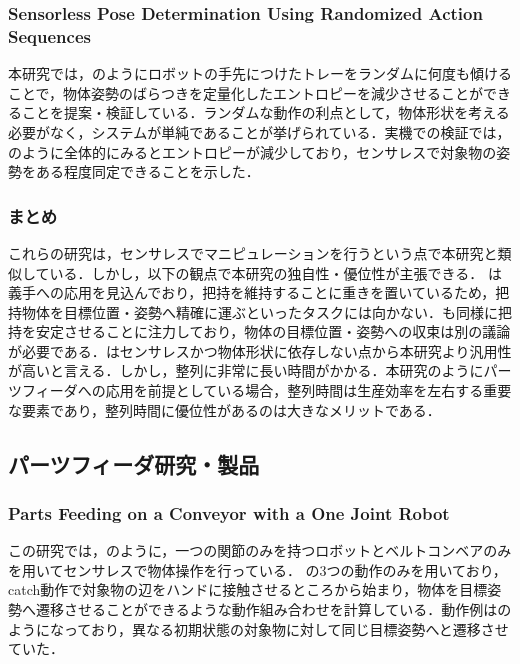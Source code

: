 \documentclass[a4paper,twoside,12pt,papersize, dvipdfmx]{iirthesis}
\begin{document}
\subsubsection{Sensorless Pose Determination Using  Randomized Action Sequences ~\cite{Mannam}}
本研究では，のようにロボットの手先につけたトレーをランダムに何度も傾けることで，物体姿勢のばらつきを定量化したエントロピーを減少させることができることを提案・検証している．ランダムな動作の利点として，物体形状を考える必要がなく，システムが単純であることが挙げられている．実機での検証では，のように全体的にみるとエントロピーが減少しており，センサレスで対象物の姿勢をある程度同定できることを示した．

\subsubsection{まとめ}
これらの研究は，センサレスでマニピュレーションを行うという点で本研究と類似している．しかし，以下の観点で本研究の独自性・優位性が主張できる．
\cite{Ospina}は義手への応用を見込んでおり，把持を維持することに重きを置いているため，把持物体を目標位置・姿勢へ精確に運ぶといったタスクには向かない．\cite{Tahara2013}\cite{Tahara2020}も同様に把持を安定させることに注力しており，物体の目標位置・姿勢への収束は別の議論が必要である．\cite{Mannam}はセンサレスかつ物体形状に依存しない点から本研究より汎用性が高いと言える．しかし，整列に非常に長い時間がかかる．本研究のようにパーツフィーダへの応用を前提としている場合，整列時間は生産効率を左右する重要な要素であり，整列時間に優位性があるのは大きなメリットである．


\subsection{パーツフィーダ研究・製品}

\subsubsection{Parts Feeding on a Conveyor with a One Joint Robot \cite{Akella}}
この研究では，のように，一つの関節のみを持つロボットとベルトコンベアのみを用いてセンサレスで物体操作を行っている．
の3つの動作のみを用いており，catch動作で対象物の辺をハンドに接触させるところから始まり，物体を目標姿勢へ遷移させることができるような動作組み合わせを計算している．動作例はのようになっており，異なる初期状態の対象物に対して同じ目標姿勢へと遷移させていた．
\end{document}
